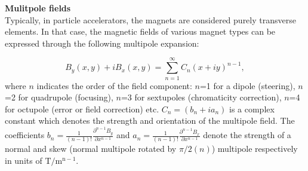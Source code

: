 \textbf{Mulitpole fields}\\
Typically, in particle accelerators, the magnets are considered purely transverse elements. In that case, the magnetic fields of various magnet types can be expressed through the following multipole expansion:

\begin{equation}\label{eq:mult_expansion} %
    B_y(x,y) + i B_x(x,y) = \sum_{n=1}^{\infty} C_n (x+i y)^{n-1},
\end{equation} %
where $n$ indicates the order of the field component: $n$=1 for a dipole (steering), $n$=2 for quadrupole (focusing), $n$=3 for sextupoles (chromaticity correction), $n$=4 for octupole (error or field correction) etc. $C_n=(b_n +i a_n)$ is a complex constant which denotes the strength and orientation of the multipole field. The coefficients $b_n=\frac{1}{(n-1)!} \frac{\partial^{n-1}B_y}{\partial x^{n-1}}$ and $a_n=\frac{1}{(n-1)!} \frac{\partial^{n-1}B_x}{\partial x^{n-1}}$ denote the strength of a normal and skew (normal multipole rotated by $\pi/2(n)$) multipole respectively in units of $\mathrm{T/m^{n-1}}$.


